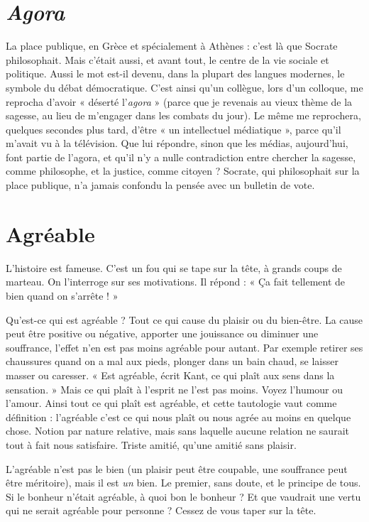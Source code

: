 \section{\it Agora}
La place publique, en Grèce et spécialement à Athènes : c’est là que
Socrate philosophait. Mais c'était aussi, et avant tout, le centre de
la vie sociale et politique. Aussi le mot est-il devenu, dans la plupart des langues
modernes, le symbole du débat démocratique. C’est ainsi qu’un collègue, lors
d’un colloque, me reprocha d’avoir « déserté l’{\it agora} » (parce que je revenais au
vieux thème de la sagesse, au lieu de m’engager dans les combats du jour). Le
même me reprochera, quelques secondes plus tard, d’être « un intellectuel
médiatique », parce qu’il m'avait vu à la télévision. Que lui répondre, sinon
que les médias, aujourd’hui, font partie de l’agora, et qu’il n’y a nulle contradiction
entre chercher la sagesse, comme philosophe, et la justice, comme
citoyen ? Socrate, qui philosophait sur la place publique, n’a jamais confondu
la pensée avec un bulletin de vote.

\section{Agréable}
L'histoire est fameuse. C’est un fou qui se tape sur la tête, à grands
coups de marteau. On l’interroge sur ses motivations. Il répond :
« Ça fait tellement de bien quand on s'arrête ! »

Qu'est-ce qui est agréable ? Tout ce qui cause du plaisir ou du bien-être. La
cause peut être positive ou négative, apporter une jouissance ou diminuer une
souffrance, l'effet n’en est pas moins agréable pour autant. Par exemple retirer
ses chaussures quand on a mal aux pieds, plonger dans un bain chaud, se laisser
masser ou caresser. « Est agréable, écrit Kant, ce qui plaît aux sens dans la
sensation. » Mais ce qui plaît à l'esprit ne l’est pas moins. Voyez l'humour ou
l'amour. Ainsi tout ce qui plaît est agréable, et cette tautologie vaut comme
définition : l’agréable c’est ce qui nous plaît ou nous agrée au moins en quelque
chose. Notion par nature relative, mais sans laquelle aucune relation ne saurait
tout à fait nous satisfaire. Triste amitié, qu’une amitié sans plaisir.

L’agréable n’est pas le bien (un plaisir peut être coupable, une souffrance peut
être méritoire), mais il est {\it un} bien. Le premier, sans doute, et le principe de tous.
Si le bonheur n’était agréable, à quoi bon le bonheur ? Et que vaudrait une vertu
qui ne serait agréable pour personne ? Cessez de vous taper sur la tête.

